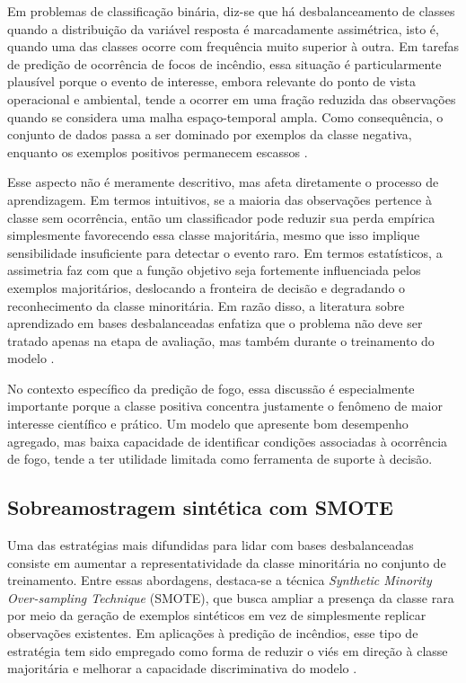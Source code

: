 Em problemas de classificação binária, diz-se que há desbalanceamento de classes quando a distribuição da variável resposta é marcadamente assimétrica, isto é, quando uma das classes ocorre com frequência muito superior à outra. Em tarefas de predição de ocorrência de focos de incêndio, essa situação é particularmente plausível porque o evento de interesse, embora relevante do ponto de vista operacional e ambiental, tende a ocorrer em uma fração reduzida das observações quando se considera uma malha espaço-temporal ampla. Como consequência, o conjunto de dados passa a ser dominado por exemplos da classe negativa, enquanto os exemplos positivos permanecem escassos \cite{phelps2021guidelines,perezporras2021wildfires}.

Esse aspecto não é meramente descritivo, mas afeta diretamente o processo de aprendizagem. Em termos intuitivos, se a maioria das observações pertence à classe sem ocorrência, então um classificador pode reduzir sua perda empírica simplesmente favorecendo essa classe majoritária, mesmo que isso implique sensibilidade insuficiente para detectar o evento raro. Em termos estatísticos, a assimetria faz com que a função objetivo seja fortemente influenciada pelos exemplos majoritários, deslocando a fronteira de decisão e degradando o reconhecimento da classe minoritária. Em razão disso, a literatura sobre aprendizado em bases desbalanceadas enfatiza que o problema não deve ser tratado apenas na etapa de avaliação, mas também durante o treinamento do modelo \cite{ling2011costsensitive}.

No contexto específico da predição de fogo, essa discussão é especialmente importante porque a classe positiva concentra justamente o fenômeno de maior interesse científico e prático. Um modelo que apresente bom desempenho agregado, mas baixa capacidade de identificar condições associadas à ocorrência de fogo, tende a ter utilidade limitada como ferramenta de suporte à decisão.

\subsection{Sobreamostragem sintética com SMOTE}

Uma das estratégias mais difundidas para lidar com bases desbalanceadas consiste em aumentar a representatividade da classe minoritária no conjunto de treinamento. Entre essas abordagens, destaca-se a técnica \textit{Synthetic Minority Over-sampling Technique} (SMOTE), que busca ampliar a presença da classe rara por meio da geração de exemplos sintéticos em vez de simplesmente replicar observações existentes. Em aplicações à predição de incêndios, esse tipo de estratégia tem sido empregado como forma de reduzir o viés em direção à classe majoritária e melhorar a capacidade discriminativa do modelo \cite{perezporras2021wildfires}.

